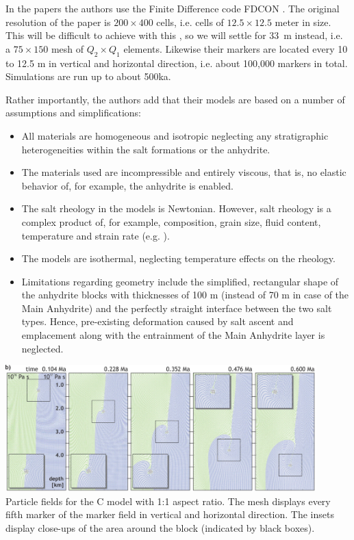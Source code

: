 In the papers the authors use the Finite Difference code  FDCON \cite{wesc92}.
The original resolution of the paper is $200 \times 400$ cells,
i.e. cells of $12.5 \times 12.5$ meter in size.
This will be difficult to achieve with this \stone, so we will settle for 33~m instead, i.e.
a $75 \times 150$ mesh of $Q_2\times Q_1$ elements.
Likewise their markers are located
every 10 to 12.5 m in vertical and horizontal direction, i.e. about 100,000 markers in total.
Simulations are run up to about 500ka.

Rather importantly, the authors add that their models are based on a number of assumptions and simplifications:

\begin{itemize}
\item All materials are homogeneous and isotropic neglecting any stratigraphic heterogeneities within the
salt formations or the anhydrite. 
\item The materials used are incompressible and entirely viscous, that is, 
no elastic behavior of, for example, the anhydrite is enabled. 
\item The salt rheology in the models is
Newtonian. However, salt rheology is a complex product of, for
example, composition, grain size, fluid content, temperature and
strain rate (e.g. \cite{ursz86,vasv93,javs94}). 
\item The models are isothermal, neglecting temperature effects on the rheology. 
\item Limitations regarding geometry include the simplified, rectangular shape of the anhydrite blocks
with thicknesses of 100 m (instead of 70 m in case of the Main
Anhydrite) and the perfectly straight interface between the two salt
types. Hence, pre-existing deformation caused by salt ascent and
emplacement along with the entrainment of the Main Anhydrite layer is neglected.
\end{itemize}



\begin{center}
\includegraphics[width=12cm]{python_codes/fieldstone_67/images/buks12c}\\
{\captionfont
Particle fields for the C model with 1:1 aspect ratio. The mesh displays every 
fifth marker of the marker field in vertical and horizontal direction. The insets 
display close-ups of the area around the block (indicated by black boxes).}
\end{center}




